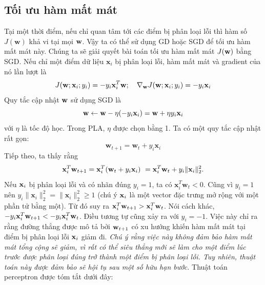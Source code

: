 \subsection{Tối ưu hàm mất mát}
Tại một thời điểm, nếu chỉ quan tâm tới các điểm bị phân loại lỗi thì hàm số
$J(\mathbf{w})$ khả vi tại mọi $\mathbf{w}$. Vậy ta có thể sử dụng GD hoặc SGD để tối
ưu hàm mất mát này. Chúng ta sẽ giải quyết bài toán tối ưu hàm mất mát $J(\mathbf{w})$
bằng SGD. Nếu chỉ {một} điểm dữ liệu $\mathbf{x}_i$ bị phân loại lỗi, hàm mất
mát và gradient của nó lần lượt là
\begin{equation}
J(\mathbf{w}; \mathbf{x}_i; y_i) = -y_i\mathbf{x}_i^T\mathbf{w}; \quad
\nabla_{\mathbf{w}}J(\mathbf{w}; \mathbf{x}_i; y_i) = -y_i\mathbf{x}_i
\end{equation}
Quy tắc cập nhật $\mathbf{w}$ sử dụng SGD là
\begin{equation}
\mathbf{w} \leftarrow \mathbf{w} - \eta (-y_i\mathbf{x}_i) = \mathbf{w} + \eta y_i\mathbf{x}_i
\end{equation}
với $\eta$ là tốc độ học. Trong PLA, $\eta$ được chọn bằng 1. Ta có một quy tắc cập nhật rất gọn:
\begin{equation}
\mathbf{w}_{t+1} = \mathbf{w}_{t} + y_i\mathbf{x}_i
\end{equation}
Tiếp theo, ta thấy rằng
\begin{equation}
\mathbf{x}_i^T\mathbf{w}_{t+1} = \mathbf{x}_i^T(\mathbf{w}_t + y_i\mathbf{x}_i) \\\
= \mathbf{x}_i^T\mathbf{w}_t + y_i \|\mathbf{x}_i\|_2^2.
\end{equation}
Nếu $\mathbf{x}_i$ bị phân loại lỗi và có nhãn đúng $y_i = 1$, ta có
$\mathbf{x}_{i}^T\mathbf{w}_t < 0$. Cũng vì $y_i = 1$ nên $y_i
\|\mathbf{x}_i\|_2^2 = \|\mathbf{x}_i\|_2^2 \geq 1$ (chú ý $\mathbf{x}_i$ là một vector đặc
trưng {mở rộng} với một phần tử bằng một). Từ đó suy ra $\mathbf{x}_i^T\mathbf{w}_{t+1} > \mathbf{x}_i^T\mathbf{w}_t$. Nói cách khác,
$-y_i\mathbf{x}_i^T\mathbf{w}_{t+1} < -y_i\mathbf{x}_i^T\mathbf{w}_t$. Điều tương tự cũng xảy ra với $y_i = -1$.
Việc này chỉ ra rằng đường thẳng được mô tả bởi $\mathbf{w}_{t+1}$ có xu hướng khiến
hàm mất mát tại điểm bị phân loại lỗi $\mathbf{x}_i$ giảm đi. \textit{Chú ý rằng việc
này không đảm bảo hàm mất mát tổng cộng sẽ giảm, vì rất có thể siêu
thẳng mới sẽ làm cho một điểm lúc trước được phân loại đúng trở thành một điểm bị
phân loại lỗi. Tuy nhiên, thuật toán này được đảm bảo sẽ hội tụ sau một số hữu
hạn bước.} Thuật toán perceptron được tóm tắt dưới đây:


